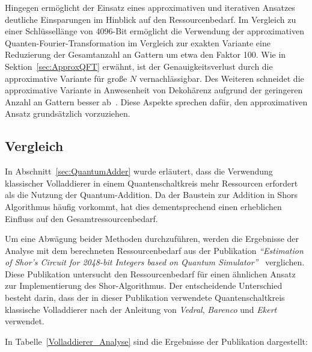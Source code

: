 Hingegen ermöglicht der Einsatz eines approximativen und iterativen Ansatzes deutliche Einsparungen im Hinblick auf den Ressourcenbedarf. 
Im Vergleich zu einer Schlüssellänge von 4096-Bit ermöglicht die Verwendung der approximativen Quanten-Fourier-Transformation im Vergleich zur exakten Variante eine Reduzierung der Gesamtanzahl an Gattern um etwa den Faktor 100.
Wie in Sektion~\ref{sec:ApproxQFT} erwähnt, ist der Genauigkeitsverlust durch die approximative Variante für große \(N\) vernachlässigbar. 
Des Weiteren schneidet die approximative Variante in Anwesenheit von Dekohärenz aufgrund der geringeren Anzahl an Gattern besser ab~\cite{Barenco_1996}. 
Diese Aspekte sprechen dafür, den approximativen Ansatz grundsätzlich vorzuziehen.

\subsection*{Vergleich}
In Abschnitt~\ref{sec:QuantumAdder} wurde erläutert, 
dass die Verwendung klassischer Volladdierer in einem Quantenschaltkreis mehr Ressourcen erfordert als die Nutzung der Quantum-Addition. 
Da der Baustein zur Addition in Shors Algorithmus häufig vorkommt, 
hat dies dementsprechend einen erheblichen Einfluss auf den Gesamtressourcenbedarf.

Um eine Abwägung beider Methoden durchzuführen, 
werden die Ergebnisse der Analyse mit dem berechneten Ressourcenbedarf aus der Publikation \textit{"`Estimation of Shor’s Circuit for 2048-bit Integers
based on Quantum Simulator"'}~\cite{cryptoeprint:2023/092} verglichen. 
Diese Publikation untersucht den Ressourcenbedarf für einen ähnlichen Ansatz zur Implementierung des Shor-Algorithmus.
Der entscheidende Unterschied besteht darin, 
dass der in dieser Publikation verwendete Quantenschaltkreis klassische Volladdierer nach der Anleitung von 
\textit{Vedral}, \textit{Barenco} und \textit{Ekert}~\cite{Vedral_1996} verwendet.

In Tabelle~\ref{Volladdierer_Analyse} sind die Ergebnisse der Publikation dargestellt:

